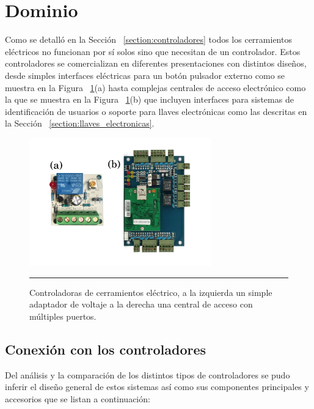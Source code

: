 \section{Dominio}
Como se detalló en la Sección ~\ref{section:controladores} todos los cerramientos eléctricos no funcionan por sí solos sino que necesitan de un controlador. Estos controladores se comercializan en diferentes presentaciones con distintos diseños, desde simples interfaces eléctricas para un botón pulsador externo como se muestra en la Figura ~\ref{fig:controladoras_simple_compleja}(a) hasta complejas centrales de acceso electrónico como la que se muestra en la Figura ~\ref{fig:controladoras_simple_compleja}(b) que incluyen interfaces para sistemas de identificación de usuarios o soporte para llaves electrónicas como las descritas en la Sección ~\ref{section:llaves_electronicas}.
\begin{figure}[htbp]
	\centering
	\includegraphics[width=0.7\textwidth]{Pictures/controladoras_simple_compleja.png}
	\rule{35em}{1pt}
	\caption[Controladoras Comparativa]{Controladoras de cerramientos eléctrico, a la izquierda un simple adaptador de voltaje a la derecha una central de acceso con múltiples puertos. }
	\label{fig:controladoras_simple_compleja}
\end{figure}
\subsection{Conexión con los controladores}
Del análisis y la comparación de los distintos tipos de controladores se pudo inferir el diseño general de estos sistemas así como sus componentes principales y accesorios que se listan a continuación:

